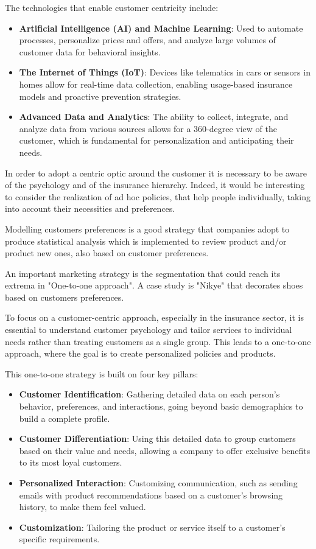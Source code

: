 \documentclass{article}
\begin{document}
The technologies that enable customer centricity include:
\begin{itemize}
\item \textbf{Artificial Intelligence (AI) and Machine Learning}: Used to automate processes, personalize prices and offers, and analyze large volumes of customer data for behavioral insights.
\item \textbf{The Internet of Things (IoT)}: Devices like telematics in cars or sensors in homes allow for real-time data collection, enabling usage-based insurance models and proactive prevention strategies.
\item \textbf{Advanced Data and Analytics}: The ability to collect, integrate, and analyze data from various sources allows for a 360-degree view of the customer, which is fundamental for personalization and anticipating their needs.
\end{itemize}

In order to adopt a centric optic around the customer it is necessary to be aware of the psychology and of the insurance hierarchy.
Indeed, it would be interesting to consider the realization of ad hoc policies, that help people individually, taking into account their necessities and preferences.

Modelling customers preferences is a good strategy that companies adopt to produce statistical analysis which is implemented to review product and/or product new ones, also based on customer preferences.

An important marketing strategy is the segmentation that could reach its extrema in "One-to-one approach". A case study is "Nikye" that decorates shoes based on customers preferences.

To focus on a customer-centric approach, especially in the insurance sector, it is essential to understand customer psychology and tailor services to individual needs rather than treating customers as a single group. This leads to a one-to-one approach, where the goal is to create personalized policies and products.

This one-to-one strategy is built on four key pillars:
\begin{itemize}
\item \textbf{Customer Identification}: Gathering detailed data on each person's behavior, preferences, and interactions, going beyond basic demographics to build a complete profile.
\item \textbf{Customer Differentiation}: Using this detailed data to group customers based on their value and needs, allowing a company to offer exclusive benefits to its most loyal customers.
\item \textbf{Personalized Interaction}: Customizing communication, such as sending emails with product recommendations based on a customer's browsing history, to make them feel valued.
\item \textbf{Customization}: Tailoring the product or service itself to a customer’s specific requirements.
\end{itemize}
\end{document}
